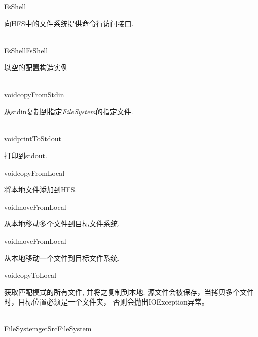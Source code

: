 \begin{XeClass}{FsShell}
   
 向HFS中的文件系统提供命令行访问接口. 

  \begin{XeMethod}{\XePublic\\ }{FsShell}{FsShell}
       
 以空的配置构造实例 

  \end{XeMethod}

  \begin{XeMethod}{\XePrivate\\ }{void}{copyFromStdin}
       
 从stdin复制到指定\emph{FileSystem}的指定文件.

  \end{XeMethod}

  \begin{XeMethod}{\XePrivate\\ }{void}{printToStdout}
       
 打印到stdout.

  \end{XeMethod}

  \begin{XeMethod}{}{void}{copyFromLocal}
       
 将本地文件添加到HFS.

  \end{XeMethod}

  \begin{XeMethod}{}{void}{moveFromLocal}
       
 从本地移动多个文件到目标文件系统.

  \end{XeMethod}

  \begin{XeMethod}{}{void}{moveFromLocal}
       
 从本地移动一个文件到目标文件系统.

  \end{XeMethod}

  \begin{XeMethod}{}{void}{copyToLocal}
       
 获取匹配模式的所有文件, 并将之复制到本地.
 源文件会被保存，当拷贝多个文件时，目标位置必须是一个文件夹，
 否则会抛出IOException异常。

  \end{XeMethod}

  \begin{XeMethod}{\XePrivate\\ }{FileSystem}{getSrcFileSystem}
       

\end{XeMethod}
\end{XeClass}
